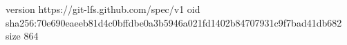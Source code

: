 version https://git-lfs.github.com/spec/v1
oid sha256:70e690eaeeb81d4c0bffdbe0a3b5946a021fd1402b84707931c9f7bad41db682
size 864
